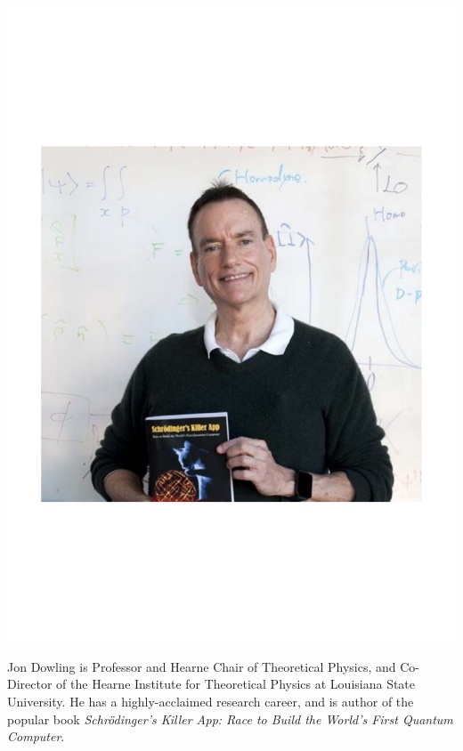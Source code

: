 \documentclass[aps,prl,twocolumn,amsmath,amssymb,nofootinbib,superscriptaddress]{revtex4}
\begin{document}
\includegraphics[width=\columnwidth]{photo_jon_dowling}

Jon Dowling is Professor and Hearne Chair of Theoretical Physics, and Co-Director of the Hearne Institute for Theoretical Physics at Louisiana State University. He has a highly-acclaimed research career, and is author of the popular book \textit{Schr\"odinger's Killer App: Race to Build the World's First Quantum Computer}.
\end{document}
